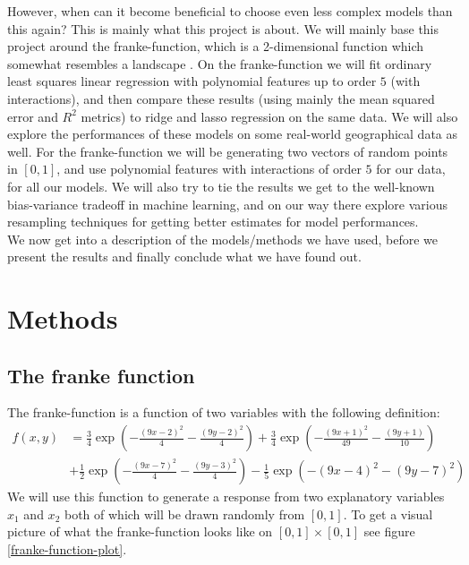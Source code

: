 \documentclass{article}
\begin{document}
However, when can it become beneficial to choose even less complex models than
this again? This is mainly what this project is about. We will mainly base this
project around the franke-function, which is a 2-dimensional function which
somewhat resembles a landscape \cite{franke2ddesc}. On the franke-function we
will fit ordinary least squares linear regression with polynomial features up to
order $5$ (with interactions), and then compare these results (using mainly the
mean squared error and $R^2$ metrics) to ridge and lasso regression on the
same data. We will also explore the performances of these models on some
real-world geographical data as well. For the franke-function we will be
generating two vectors of random points in $\left[ 0, 1 \right]$, and use
polynomial features with interactions of order $5$ for our data, for all our
models. We will also try to tie the results we get to the well-known
bias-variance tradeoff in machine learning, and on our way there explore various
resampling techniques for getting better estimates for model performances.
\\

We now get into a description of the models/methods we have used, before we present the
results and finally conclude what we have found out.

\section{Methods}
\subsection{The franke function}
The franke-function is a function of two variables with the following definition:
\begin{align*}
    f(x,y) & = \frac{3}{4}\exp{\left(-\frac{(9x-2)^2}{4} - \frac{(9y-2)^2}{4}\right)}+\frac{3}{4}\exp{\left(-\frac{(9x+1)^2}{49}- \frac{(9y+1)}{10}\right)} \\
           & +\frac{1}{2}\exp{\left(-\frac{(9x-7)^2}{4} - \frac{(9y-3)^2}{4}\right)} -\frac{1}{5}\exp{\left(-(9x-4)^2 - (9y-7)^2\right) }
\end{align*}
We will use this function to generate a response from two explanatory variables
$x_1$ and $x_2$ both of which will be drawn randomly from $\left[ 0, 1 \right]$.
To get a visual picture of what the franke-function looks like on $\left[ 0, 1
        \right] \times \left[ 0, 1 \right]$ see figure \ref{franke-function-plot}.
\end{document}

